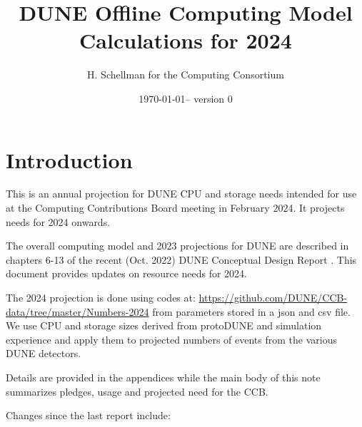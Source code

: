 \documentclass[12pt]{article}
\title{DUNE Offline Computing Model Calculations for 2024}
\author{H. Schellman for the Computing Consortium}
\date{\today -- version 0}
\begin{document}
\makeatletter
{}
\makeatother
\newcommand{\csvautotabularright}[2][]{\csvloop{autotabularright={#2},#1}}

\maketitle



\section{Introduction}

This is an annual projection for DUNE CPU and storage needs intended for use at the Computing Contributions Board meeting in February 2024. It projects needs for 2024 onwards. 

The overall computing model  and 2023 projections for DUNE are described in chapters 6-13 of the recent (Oct. 2022) DUNE Conceptual Design Report \cite{DUNE:2022fcw}.   This document provides updates on resource needs for 2024. 

The 2024 projection is done using codes at: \href{https://github.com/DUNE/CCB-data/tree/master/Numbers-2024}{https://github.com/DUNE/CCB-data/tree/master/Numbers-2024} from parameters stored in a json and csv file. We use CPU and storage sizes derived from protoDUNE and simulation experience and apply them to projected numbers of events from the various DUNE detectors. 

Details are provided in the appendices while the main body of this note summarizes pledges, usage and projected need for the CCB.




Changes since the last report \cite{CCBReport2023} include:
\end{document}
